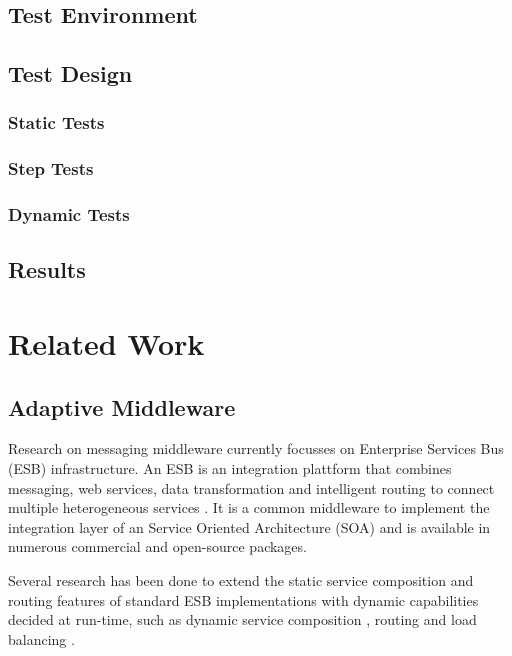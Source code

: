 \subsection{Test Environment}

\subsection{Test Design}

\subsubsection{Static Tests}

\subsubsection{Step Tests}

\subsubsection{Dynamic Tests}

\subsection{Results}

\section{Related Work}\label{sec:ch5_related_work}
\subsection{Adaptive Middleware}
Research on messaging middleware currently focusses on Enterprise Services Bus (ESB) infrastructure. An ESB is an integration plattform that combines messaging, web services, data transformation and intelligent routing to connect multiple heterogeneous services \citep{Chappell:2004jo}. It is a common middleware to implement the integration layer of an Service Oriented Architecture (SOA) and is available in numerous commercial and open-source packages.

Several research has been done to extend the static service composition and routing features of standard ESB implementations with dynamic capabilities decided at run-time, such as dynamic service composition \citep{Chang:2007aa}, routing \citep{Bai:2007aa} \citep{Wu:2008aa} \citep{Ziyaeva:2008aa} and load balancing \citep{Jongtaveesataporn:2010aa}.

